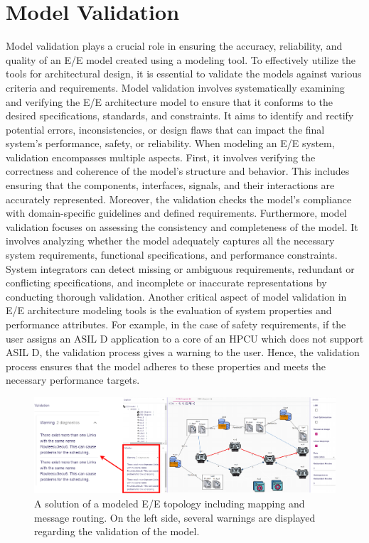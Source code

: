     \section{Model Validation}
    
    Model validation plays a crucial role in ensuring the accuracy, reliability, and quality of an E/E model created using a modeling tool. %
     To effectively utilize the tools for architectural design, it is essential to validate the models against various criteria and requirements.
    Model validation involves systematically examining and verifying the E/E architecture model to ensure that it conforms to the desired specifications, standards, and constraints. It aims to identify and rectify potential errors, inconsistencies, or design flaws that can impact the final system's performance, safety, or reliability.
    When modeling an E/E system, validation encompasses multiple aspects. First, it involves verifying the correctness and coherence of the model's structure and behavior. This includes ensuring that the components, interfaces, signals, and their interactions are accurately represented. Moreover, the validation checks the model's compliance with domain-specific guidelines and defined requirements.
    Furthermore, model validation focuses on assessing the consistency and completeness of the model. It involves analyzing whether the model adequately captures all the necessary system requirements, functional specifications, and performance constraints. System integrators can detect missing or ambiguous requirements, redundant or conflicting specifications, and incomplete or inaccurate representations by conducting thorough validation.    
    Another critical aspect of model validation in E/E architecture modeling tools is the evaluation of system properties and performance attributes. For example, in the case of safety requirements, if the user assigns an ASIL D application to a core of an HPCU which does not support ASIL D, the validation process gives a warning to the user. Hence, the validation process ensures that the model adheres to these properties and meets the necessary performance targets.
            \begin{figure}[t]
    	\centering
    	\includegraphics[width=1\columnwidth]{figures/validation.pdf}
    	\caption{A solution of a modeled E/E topology including mapping and message routing. On the left side, several warnings are displayed regarding the validation of the model.}
    	\label{fig10}
    \end{figure}
